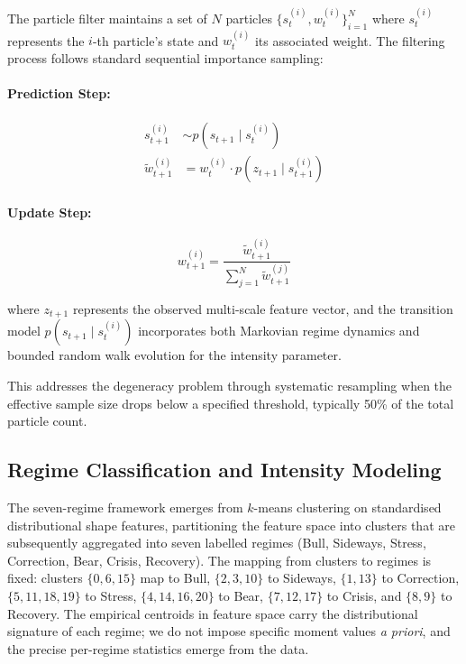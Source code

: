 \documentclass[11pt]{article}
\begin{document}
The particle filter maintains a set of $N$ particles
$\{s_t^{(i)}, w_t^{(i)}\}_{i=1}^{N}$ where $s_t^{(i)}$ represents the
$i$-th particle's state and $w_t^{(i)}$ its associated weight. The
filtering process follows standard sequential importance sampling:

\paragraph{Prediction Step:}
\begin{align}
s_{t+1}^{(i)} &\sim p(s_{t+1} \mid s_t^{(i)}) \\[4pt]
\tilde{w}_{t+1}^{(i)} &= w_t^{(i)} \cdot p(z_{t+1} \mid s_{t+1}^{(i)})
\end{align}

\paragraph{Update Step:}
\begin{equation}
w_{t+1}^{(i)} = \frac{\tilde{w}_{t+1}^{(i)}}
                     {\sum_{j=1}^{N} \tilde{w}_{t+1}^{(j)}}
\end{equation}

where $z_{t+1}$ represents the observed multi-scale feature vector, and
the transition model $p(s_{t+1} \mid s_t^{(i)})$ incorporates both
Markovian regime dynamics and bounded random walk evolution for the
intensity parameter.

This addresses the degeneracy problem through systematic resampling when
the effective sample size drops below a specified threshold, typically
50\% of the total particle count.

\subsection{Regime Classification and Intensity Modeling}

The seven-regime framework emerges from $k$-means clustering on
standardised distributional shape features, partitioning the feature
space into clusters that are subsequently aggregated into seven labelled
regimes (Bull, Sideways, Stress, Correction, Bear, Crisis, Recovery).
The mapping from clusters to regimes is fixed: clusters $\{0,6,15\}$ map
to Bull, $\{2,3,10\}$ to Sideways, $\{1,13\}$ to Correction,
$\{5,11,18,19\}$ to Stress, $\{4,14,16,20\}$ to Bear, $\{7,12,17\}$ to
Crisis, and $\{8,9\}$ to Recovery. The empirical centroids in feature
space carry the distributional signature of each regime; we do not
impose specific moment values \emph{a priori}, and the precise
per-regime statistics emerge from the data.
\end{document}
